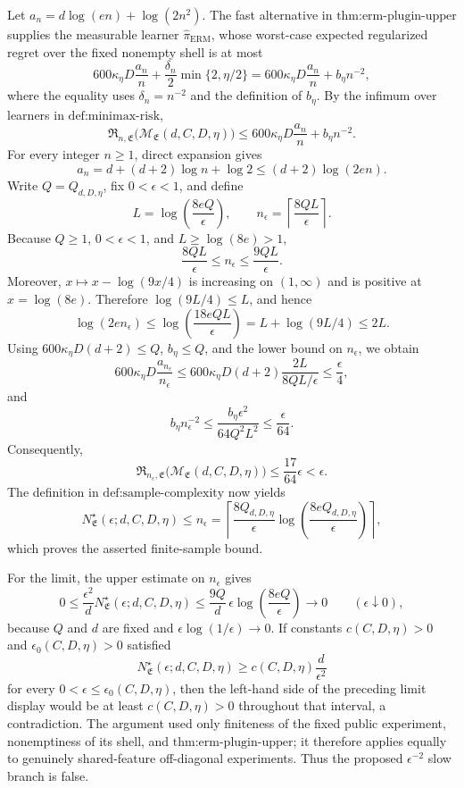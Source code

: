 Let \(a_n=d\log(en)+\log(2n^2)\). The fast alternative in \(\text{thm:erm-plugin-upper}\) supplies the measurable learner \(\widehat\pi_{\mathrm{ERM}}\), whose worst-case expected regularized regret over the fixed nonempty shell is at most
\[
600\kappa_\eta D\frac{a_n}{n}+\frac{\delta_n}{2}\min\{2,\eta/2\}
=600\kappa_\eta D\frac{a_n}{n}+b_\eta n^{-2},
\]
where the equality uses \(\delta_n=n^{-2}\) and the definition of \(b_\eta\). By the infimum over learners in \(\text{def:minimax-risk}\),
\[
\mathfrak R_{n,\mathfrak E}\bigl(\mathcal M_{\mathfrak E}(d,C,D,\eta)\bigr)
\le 600\kappa_\eta D\frac{a_n}{n}+b_\eta n^{-2}.
\]
For every integer \(n\ge1\), direct expansion gives
\[
a_n=d+(d+2)\log n+\log2
\le(d+2)\log(2en).
\]
Write \(Q=Q_{d,D,\eta}\), fix \(0<\epsilon<1\), and define
\[
L=\log\!\left(\frac{8eQ}{\epsilon}\right),
\qquad
n_\epsilon=\left\lceil\frac{8QL}{\epsilon}\right\rceil.
\]
Because \(Q\ge1\), \(0<\epsilon<1\), and \(L\ge\log(8e)>1\),
\[
\frac{8QL}{\epsilon}\le n_\epsilon\le\frac{9QL}{\epsilon}.
\]
Moreover, \(x\mapsto x-\log(9x/4)\) is increasing on \((1,\infty)\) and is positive at \(x=\log(8e)\). Therefore \(\log(9L/4)\le L\), and hence
\[
\log(2en_\epsilon)
\le\log\!\left(\frac{18eQL}{\epsilon}\right)
=L+\log(9L/4)
\le2L.
\]
Using \(600\kappa_\eta D(d+2)\le Q\), \(b_\eta\le Q\), and the lower bound on \(n_\epsilon\), we obtain
\[
600\kappa_\eta D\frac{a_{n_\epsilon}}{n_\epsilon}
\le600\kappa_\eta D(d+2)\frac{2L}{8QL/\epsilon}
\le\frac{\epsilon}{4},
\]
and
\[
b_\eta n_\epsilon^{-2}
\le\frac{b_\eta\epsilon^2}{64Q^2L^2}
\le\frac{\epsilon}{64}.
\]
Consequently,
\[
\mathfrak R_{n_\epsilon,\mathfrak E}
\bigl(\mathcal M_{\mathfrak E}(d,C,D,\eta)\bigr)
\le\frac{17}{64}\epsilon<\epsilon.
\]
The definition in \(\text{def:sample-complexity}\) now yields
\[
N^\star_{\mathfrak E}(\epsilon;d,C,D,\eta)
\le n_\epsilon
=\left\lceil\frac{8Q_{d,D,\eta}}{\epsilon}
\log\!\left(\frac{8eQ_{d,D,\eta}}{\epsilon}\right)\right\rceil,
\]
which proves the asserted finite-sample bound.

For the limit, the upper estimate on \(n_\epsilon\) gives
\[
0\le\frac{\epsilon^2}{d}N^\star_{\mathfrak E}(\epsilon;d,C,D,\eta)
\le\frac{9Q}{d}\,\epsilon\log\!\left(\frac{8eQ}{\epsilon}\right)
\longrightarrow0
\qquad(\epsilon\downarrow0),
\]
because \(Q\) and \(d\) are fixed and \(\epsilon\log(1/\epsilon)\to0\). If constants \(c(C,D,\eta)>0\) and \(\epsilon_0(C,D,\eta)>0\) satisfied
\[
N^\star_{\mathfrak E}(\epsilon;d,C,D,\eta)
\ge c(C,D,\eta)\frac d{\epsilon^2}
\]
for every \(0<\epsilon\le\epsilon_0(C,D,\eta)\), then the left-hand side of the preceding limit display would be at least \(c(C,D,\eta)>0\) throughout that interval, a contradiction. The argument used only finiteness of the fixed public experiment, nonemptiness of its shell, and \(\text{thm:erm-plugin-upper}\); it therefore applies equally to genuinely shared-feature off-diagonal experiments. Thus the proposed \(\epsilon^{-2}\) slow branch is false.